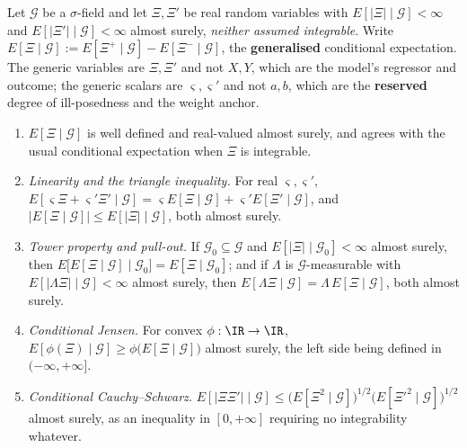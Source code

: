 \begin{lemma}\label{lem:pgence}
Let $\mathcal G$ be a $\sigma$-field and let $\Xi,\Xi'$ be real random variables with
$E[|\Xi|\mid\mathcal G]<\infty$ and $E[|\Xi'|\mid\mathcal G]<\infty$ almost surely, \emph{neither
assumed integrable}. Write $E[\Xi\mid\mathcal G]:=E[\Xi^{+}\mid\mathcal G]-E[\Xi^{-}\mid\mathcal G]$, the
\textbf{generalised} conditional expectation. The generic variables are $\Xi,\Xi'$ and not $X,Y$,
which are the model's regressor and outcome; the generic scalars are $\varsigma,\varsigma'$ and not $a,b$,
which are the \textbf{reserved} degree of ill-posedness and the weight anchor.
\begin{enumerate}
\item[(i)] $E[\Xi\mid\mathcal G]$ is well defined and real-valued almost surely, and agrees with the usual
conditional expectation when $\Xi$ is integrable.
\item[(ii)] \emph{Linearity and the triangle inequality.} For real $\varsigma,\varsigma'$,
$E[\varsigma\Xi+\varsigma'\Xi'\mid\mathcal G]
=\varsigma E[\Xi\mid\mathcal G]+\varsigma'E[\Xi'\mid\mathcal G]$, and
$|E[\Xi\mid\mathcal G]|\le E[|\Xi|\mid\mathcal G]$, both almost surely.
\item[(iii)] \emph{Tower property and pull-out.} If $\mathcal G_0\subseteq\mathcal G$ and
$E[|\Xi|\mid\mathcal G_0]<\infty$ almost surely, then
$E\big[E[\Xi\mid\mathcal G]\mid\mathcal G_0\big]=E[\Xi\mid\mathcal G_0]$; and if $\Lambda$ is
$\mathcal G$-measurable with $E[|\Lambda\Xi|\mid\mathcal G]<\infty$ almost surely, then
$E[\Lambda\Xi\mid\mathcal G]=\Lambda\,E[\Xi\mid\mathcal G]$, both almost surely.
\item[(iv)] \emph{Conditional Jensen.} For convex $\phi:\IR\to\IR$,
$E[\phi(\Xi)\mid\mathcal G]\ge\phi\big(E[\Xi\mid\mathcal G]\big)$ almost surely, the left side being
defined in $(-\infty,+\infty]$.
\item[(v)] \emph{Conditional Cauchy--Schwarz.}
$E[|\Xi\Xi'|\mid\mathcal G]\le\big(E[\Xi^{2}\mid\mathcal G]\big)^{1/2}\big(E[\Xi'^{2}\mid\mathcal G]\big)^{1/2}$
almost surely, as an inequality in $[0,+\infty]$ requiring no integrability whatever.
\end{enumerate}
\end{lemma}


